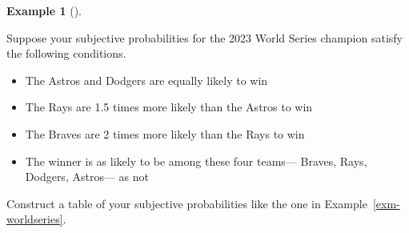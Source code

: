 \documentclass[
  letterpaper,
  DIV=11,
  numbers=noendperiod]{scrreprt}
\providecommand{\tightlist}{%
  \setlength{\itemsep}{0pt}\setlength{\parskip}{0pt}}
\theoremstyle{plain}
\theoremstyle{definition}
\newtheorem{example}{Example}[chapter]
\theoremstyle{definition}
\theoremstyle{definition}
\theoremstyle{remark}
\begin{document}
\begin{tcolorbox}[enhanced jigsaw, opacityback=0, left=2mm, colframe=quarto-callout-note-color-frame, toprule=.15mm, breakable, colback=white, leftrule=.75mm, arc=.35mm, rightrule=.15mm, bottomrule=.15mm]

\begin{example}[]\protect\hypertarget{exm-worldseries-proportional}{}\label{exm-worldseries-proportional}

Suppose your subjective probabilities for the 2023 World Series champion
satisfy the following conditions.

\begin{itemize}
\tightlist
\item
  The Astros and Dodgers are equally likely to win
\item
  The Rays are 1.5 times more likely than the Astros to win
\item
  The Braves are 2 times more likely than the Rays to win
\item
  The winner is as likely to be among these four teams--- Braves, Rays,
  Dodgers, Astros--- as not
\end{itemize}

Construct a table of your subjective probabilities like the one in
Example~\ref{exm-worldseries}.

\end{example}

\end{tcolorbox}
\end{document}
